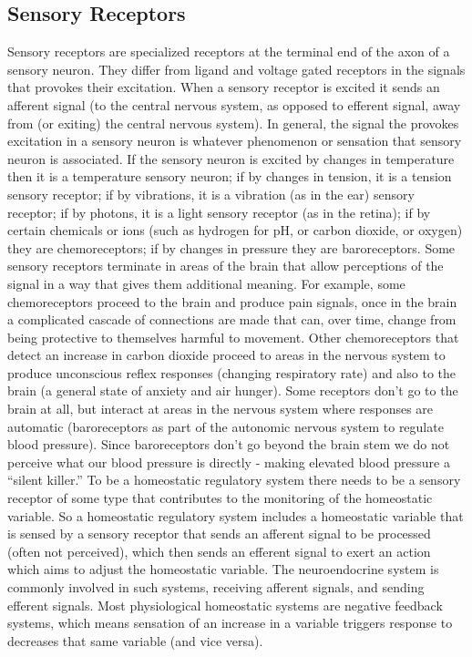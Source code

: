 \subsection{Sensory Receptors}

Sensory receptors are specialized receptors at the terminal end of the axon of a sensory neuron. They differ from ligand and voltage gated receptors in the signals that provokes their excitation. When a sensory receptor is excited it sends an afferent signal (to the central nervous system, as opposed to efferent signal, away from (or exiting) the central nervous system). In general, the signal the provokes excitation in a sensory neuron is whatever phenomenon or sensation that sensory neuron is associated. If the sensory neuron is excited by changes in temperature then it is a temperature sensory neuron; if by changes in tension, it is a tension sensory receptor; if by vibrations, it is a vibration (as in the ear) sensory receptor; if by photons, it is a light sensory receptor (as in the retina); if by certain chemicals or ions (such as hydrogen for pH, or carbon dioxide, or oxygen) they are chemoreceptors; if by changes in pressure they are baroreceptors. Some sensory receptors terminate in areas of the brain that allow perceptions of the signal in a way that gives them additional meaning. For example, some chemoreceptors proceed to the brain and produce pain signals, once in the brain a complicated cascade of connections are made that can, over time, change from being protective to themselves harmful to movement. Other chemoreceptors that detect an increase in carbon dioxide proceed to areas in the nervous system to produce unconscious reflex responses (changing respiratory rate) and also to the brain (a general state of anxiety and air hunger). Some receptors don’t go to the brain at all, but interact at areas in the nervous system where responses are automatic (baroreceptors as part of the autonomic nervous system to regulate blood pressure). Since baroreceptors don’t go beyond the brain stem we do not perceive what our blood pressure is directly - making elevated blood pressure a “silent killer.” To be a homeostatic regulatory system there needs to be a sensory receptor of some type that contributes to the monitoring of the homeostatic variable. So a homeostatic regulatory system includes a homeostatic variable that is sensed by a sensory receptor that sends an afferent signal to be processed (often not perceived), which then sends an efferent signal to exert an action which aims to adjust the homeostatic variable. The neuroendocrine system is commonly involved in such systems, receiving afferent signals, and sending efferent signals. Most physiological homeostatic systems are negative feedback systems, which means sensation of an increase in a variable triggers response to decreases that same variable (and vice versa).


